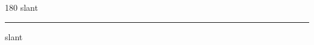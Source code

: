 
\begin{frame}
\begin{center}
\begin{turn}{180}
{\fontsize{2.5cm}{1em}\selectfont slant}
\end{turn}
\vspace{1em}\par  
\hrule
\vspace{1em}\par  
{\fontsize{2.5cm}{1em}\selectfont slant}
\end{center}
\end{frame}
